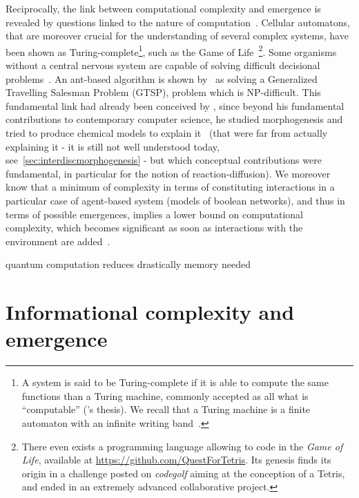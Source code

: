 

Reciprocally, the link between computational complexity and emergence is revealed by questions linked to the nature of computation~\cite{moore2011nature}. Cellular automatons, that are moreover crucial for the understanding of several complex systems, have been shown as Turing-complete\footnote{A system is said to be Turing-complete if it is able to compute the same functions than a Turing machine, commonly accepted as all what is ``computable'' ('s thesis). We recall that a Turing machine is a finite automaton with an infinite writing band~\cite{moore2011nature}.}, such as the Game of Life~\cite{beer2004autopoiesis}\footnote{There even exists a programming language allowing to code in the \emph{Game of Life}, available at \url{https://github.com/QuestForTetris}. Its genesis finds its origin in a challenge posted on \emph{codegolf} aiming at the conception of a Tetris, and ended in an extremely advanced collaborative project.}. Some organisms without a central nervous system are capable of solving difficult decisional problems~\cite{reid2016decision}. An ant-based algorithm is shown by~\cite{Pintea2017} as solving a Generalized Travelling Salesman Problem (GTSP), problem which is NP-difficult. This fundamental link had already been conceived by , since beyond his fundamental contributions to contemporary computer science, he studied morphogenesis and tried to produce chemical models to explain it~\cite{turing1952chemical} (that were far from actually explaining it - it is still not well understood today, see~\ref{sec:interdiscmorphogenesis} - but which conceptual contributions were fundamental, in particular for the notion of reaction-diffusion). We moreover know that a minimum of complexity in terms of constituting interactions in a particular case of agent-based system (models of boolean networks), and thus in terms of possible emergences, implies a lower bound on computational complexity, which becomes significant as soon as interactions with the environment are added~\cite{tovsic2017boolean}.



\cite{2017arXiv170404231E} quantum computation reduces drastically memory needed


\section{Informational complexity and emergence}


